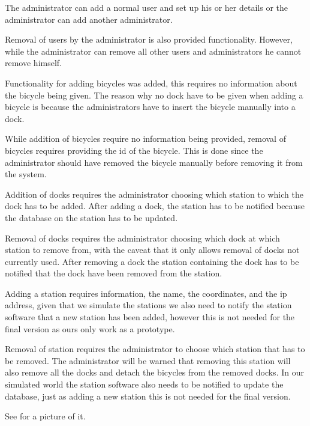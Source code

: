 \begin{description}[style=nextline]
\item[Add User] The administrator can add a normal user and set up his or her details or the administrator can add another administrator.
\item[Remove User] Removal of users by the administrator is also provided functionality.
However, while the administrator can remove all other users and administrators he cannot remove himself.
\item[Add Bicycle] Functionality for adding bicycles was added, this requires no information about the bicycle being given.
The reason why no  dock have to be given when adding a bicycle is because the administrators have to insert the bicycle manually into a dock.
\item[Remove Bicycle] While addition of bicycles require no information being provided, removal of bicycles requires providing the id of the bicycle.
This is done since the administrator should have removed the bicycle manually before removing it from the system.
\item[Add Dock] Addition of docks requires the administrator choosing which station to which the dock has to be added.
After adding a dock, the station has to be notified because the database on the station has to be updated.
\item[Remove Dock] Removal of docks requires the administrator choosing which dock at which station to remove from, with the caveat that it only allows removal of docks not currently used.
After removing a dock the station containing the dock has to be notified that the dock have been removed from the station.
\item[Add Station] Adding a station requires information, the name, the coordinates, and the ip address, given that we simulate the stations we also need to notify the station software that a new station has been added, however this is not needed for the final version as ours only work as a prototype.
\item[Remove Station] Removal of station requires the administrator to choose which station that has to be removed.
The administrator will be warned that removing this station will also remove all the docks and detach the bicycles from the removed docks.
In our simulated world the station software also needs to be notified to update the database, just as adding a new station this is not needed for the final version.

See  for a picture of it.
\end{description}